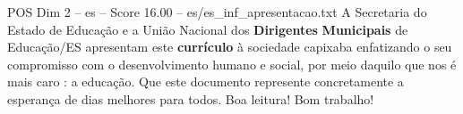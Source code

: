 \begin{textsample}{POS Dim 2 – es – Score 16.00 – es/es\_inf\_apresentacao.txt}
A Secretaria do Estado de Educação e a União Nacional dos \textbf{Dirigentes} \textbf{Municipais} de Educação/ES apresentam este \textbf{currículo} à sociedade capixaba enfatizando o seu compromisso com o desenvolvimento humano e social, por meio daquilo que nos é mais caro : a educação.
Que este documento represente concretamente a esperança de dias melhores para todos.
Boa leitura!
Bom trabalho!

\end{textsample}
